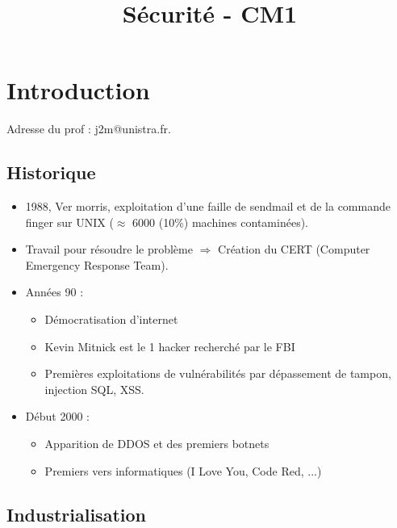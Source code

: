 \documentclass[11pt,a4paper]{article}
\title{Sécurité - CM1}
\begin{document}
	
	\maketitle
	
	\section{Introduction}
	
	Adresse du prof : j2m@unistra.fr.\\
	
	\subsection{Historique}
	
	\begin{itemize}
		\item 1988, Ver morris, exploitation d'une faille de sendmail et de la commande finger sur UNIX ($\approx $ 6000 (10\%) machines contaminées).
		\item Travail pour résoudre le problème $\Rightarrow$ Création du CERT (Computer Emergency Response Team).
		\item Années 90 :
		\begin{itemize}
			\item Démocratisation d'internet
			\item Kevin Mitnick est le 1\ier{} hacker recherché par le FBI
			\item Premières exploitations de vulnérabilités par dépassement de tampon, injection SQL, XSS.
		\end{itemize}
		\item Début 2000 :
		\begin{itemize}
			\item Apparition de DDOS et des premiers botnets
			\item Premiers vers informatiques (I Love You, Code Red, ...)
		\end{itemize}
	\end{itemize}
	
	\subsection{Industrialisation}
	
\end{document}
